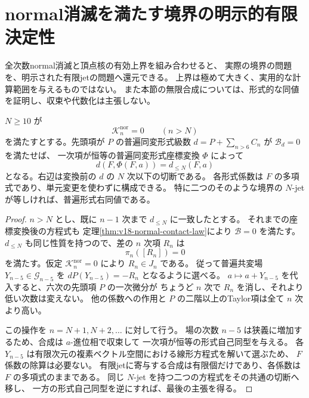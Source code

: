 

\section{normal消滅を満たす境界の明示的有限決定性}
\label{sec:v18-finite-determinacy}

全次数normal消滅と頂点核の有効上界を組み合わせると、
実際の境界の問題を、明示された有限jetの問題へ還元できる。
上界は極めて大きく、実用的な計算範囲を与えるものではない。
また本節の無限合成については、形式的な同値を証明し、収束や代数化は主張しない。

\begin{theorem}[normal消滅部分における形式的有限決定性]
\label{thm:v18-relative-finite-determinacy}
$N\ge10$ が
\[
 \mathcal K_n^{\mathrm{nor}}=0\qquad(n>N)
\]
を満たすとする。先頭項が $P$ の普遍同変形式級数
$d=P+\sum_{n>6}C_n$ が $\mathcal B_d=0$ を満たせば、
一次項が恒等の普遍同変形式座標変換 $\Phi$ によって
\begin{equation}\label{eq:v18-formal-finite-truncation}
 d(F,\Phi(F,a))=d_{\le N}(F,a)
\end{equation}
となる。右辺は変換前の $d$ の $N$ 次以下の切断である。
各形式係数は $F$ の多項式であり、単元変更を使わずに構成できる。
特に二つのそのような境界の $N$-jet が等しければ、普遍形式右同値である。
\end{theorem}

\begin{proof}
$n>N$ とし、既に $n-1$ 次まで $d_{\le N}$ に一致したとする。
それまでの座標変換後の方程式も
定理\ref{thm:v18-normal-contact-law}により $\mathcal B=0$ を満たす。
$d_{\le N}$ も同じ性質を持つので、差の $n$ 次項 $R_n$ は
\[
 \pi_n([R_n])=0
\]
を満たす。仮定 $\mathcal K_n^{\mathrm{nor}}=0$ により $R_n\in J_n$ である。
従って普遍共変場 $Y_{n-5}\in\mathcal G_{n-5}$ を
$dP(Y_{n-5})=-R_n$ となるように選べる。
$a\mapsto a+Y_{n-5}$ を代入すると、六次の先頭項 $P$ の一次微分が
ちょうど $n$ 次で $R_n$ を消し、それより低い次数は変えない。
他の係数への作用と $P$ の二階以上のTaylor項は全て $n$ 次より高い。

この操作を $n=N+1,N+2,\ldots$ に対して行う。
場の次数 $n-5$ は狭義に増加するため、合成は $a$-進位相で収束して
一次項が恒等の形式自己同型を与える。
各 $Y_{n-5}$ は有限次元の複素ベクトル空間における線形方程式を解いて選ぶため、
$F$ 係数の除算は必要ない。
有限jetに寄与する合成は有限個だけであり、各係数は $F$ の多項式のままである。
同じ $N$-jet を持つ二つの方程式をその共通の切断へ移し、
一方の形式自己同型を逆にすれば、最後の主張を得る。
\end{proof}

